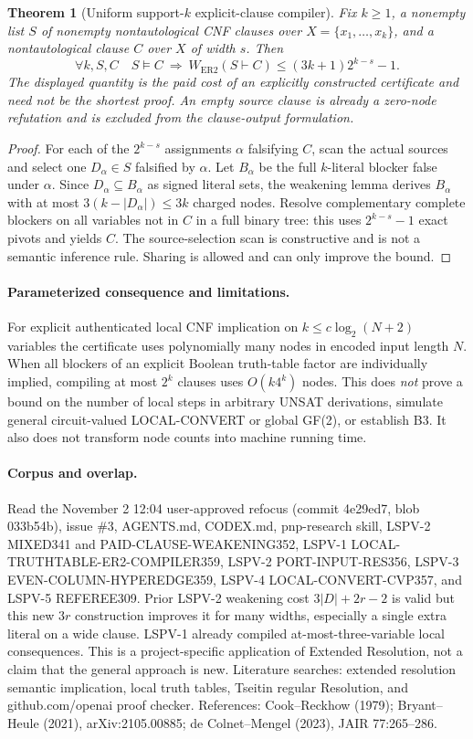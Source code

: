\documentclass[11pt]{article}
\newtheorem{theorem}{Theorem}
\begin{document}
\begin{theorem}[Uniform support-$k$ explicit-clause compiler]
Fix $k\ge1$, a nonempty list $S$ of nonempty nontautological CNF clauses over $X=\{x_1,\ldots,x_k\}$, and a nontautological clause $C$ over $X$ of width $s$. Then
\[
\forall k,S,C\quad
S\models C\ \Longrightarrow\
W_{\mathrm{ER2}}(S\vdash C)\le (3k+1)2^{k-s}-1.
\]
The displayed quantity is the paid cost of an explicitly constructed certificate and need not be the shortest proof. An empty source clause is already a zero-node refutation and is excluded from the clause-output formulation.
\end{theorem}
\begin{proof}
For each of the $2^{k-s}$ assignments $\alpha$ falsifying $C$, scan the actual sources and select one $D_\alpha\in S$ falsified by $\alpha$. Let $B_\alpha$ be the full $k$-literal blocker false under $\alpha$. Since $D_\alpha\subseteq B_\alpha$ as signed literal sets, the weakening lemma derives $B_\alpha$ with at most $3(k-|D_\alpha|)\le3k$ charged nodes. Resolve complementary complete blockers on all variables not in $C$ in a full binary tree: this uses $2^{k-s}-1$ exact pivots and yields $C$. The source-selection scan is constructive and is not a semantic inference rule. Sharing is allowed and can only improve the bound.
\end{proof}

\paragraph{Parameterized consequence and limitations.} For explicit authenticated local CNF implication on $k\le c\log_2(N+2)$ variables the certificate uses polynomially many nodes in encoded input length $N$. When all blockers of an explicit Boolean truth-table factor are individually implied, compiling at most $2^k$ clauses uses $O(k4^k)$ nodes. This does \emph{not} prove a bound on the number of local steps in arbitrary UNSAT derivations, simulate general circuit-valued LOCAL-CONVERT or global GF(2), or establish B3. It also does not transform node counts into machine running time.

\paragraph{Corpus and overlap.} Read the November 2 12:04 user-approved refocus (commit 4e29ed7, blob 033b54b), issue \#3, AGENTS.md, CODEX.md, pnp-research skill, LSPV-2 MIXED341 and PAID-CLAUSE-WEAKENING352, LSPV-1 LOCAL-TRUTHTABLE-ER2-COMPILER359, LSPV-2 PORT-INPUT-RES356, LSPV-3 EVEN-COLUMN-HYPEREDGE359, LSPV-4 LOCAL-CONVERT-CVP357, and LSPV-5 REFEREE309. Prior LSPV-2 weakening cost $3|D|+2r-2$ is valid but this new $3r$ construction improves it for many widths, especially a single extra literal on a wide clause. LSPV-1 already compiled at-most-three-variable local consequences. This is a project-specific application of Extended Resolution, not a claim that the general approach is new. Literature searches: extended resolution semantic implication, local truth tables, Tseitin regular Resolution, and github.com/openai proof checker. References: Cook--Reckhow (1979); Bryant--Heule (2021), arXiv:2105.00885; de Colnet--Mengel (2023), JAIR 77:265--286.
\end{document}
